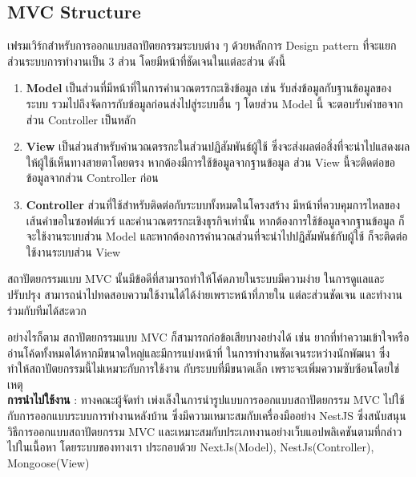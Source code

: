 \subsection{MVC Structure}
เฟรมเวิร์กสำหรับการออกแบบสถาปัตยกรรมระบบต่าง ๆ ด้วยหลักการ Design pattern
ที่จะแยกส่วนระบบการทำงานเป็น 3 ส่วน โดยมีหน้าที่ชัดเจนในแต่ละส่วน ดังนี้
\begin{enumerate}
      \item \textbf{Model} เป็นส่วนที่มีหน้าที่ในการคำนวณตรรกะเชิงข้อมูล เช่น รับส่งข้อมูลกับฐานข้อมูลของระบบ รวมไปถึงจัดการกับข้อมูลก่อนส่งไปสู่ระบบอื่น ๆ โดยส่วน Model นี้ จะตอบรับคำขอจากส่วน Controller เป็นหลัก
      \item \textbf{View} เป็นส่วนสำหรับคำนวณตรรกะในส่วนปฏิสัมพันธ์ผู้ใช้ ซึ่งจะส่งผลต่อสิ่งที่จะนำไปแสดงผลให้ผู้ใช้เห็นทางสายตาโดยตรง หากต้องมีการใช้ข้อมูลจากฐานข้อมูล ส่วน View นี้จะติดต่อขอข้อมูลจากส่วน Controller ก่อน
      \item \textbf{Controller} ส่วนที่ใช้สำหรับติดต่อกับระบบทั้งหมดในโครงสร้าง มีหน้าที่ควบคุมการไหลของเส้นคำขอในซอฟต์แวร์ และคำนวณตรรกะเชิงธุรกิจเท่านั้น หากต้องการใช้ข้อมูลจากฐานข้อมูล ก็จะใช้งานระบบส่วน Model และหากต้องการคำนวณส่วนที่จะนำไปปฏิสัมพันธ์กับผู้ใช้ ก็จะติดต่อใช้งานระบบส่วน View
\end{enumerate}
\par สถาปัตยกรรมแบบ MVC นั้นมีข้อดีที่สามารถทำให้โค้ดภายในระบบมีความง่าย
ในการดูแลและปรับปรุง สามารถนำไปทดสอบความใช้งานได้ได้ง่ายเพราะหน้าที่ภายใน
แต่ละส่วนชัดเจน และทำงานร่วมกับทีมได้สะดวก
\par อย่างไรก็ตาม สถาปัตยกรรมแบบ MVC ก็สามารถก่อข้อเสียบางอย่างได้ เช่น
ยากที่ทำความเข้าใจหรืออ่านโค้ดทั้งหมดได้หากมีขนาดใหญ่และมีการแบ่งหน้าที่
ในการทำงานชัดเจนระหว่างนักพัฒนา ซึ่งทำให้สถาปัตยกรรมนี้ไม่เหมาะกับการใช้งาน
กับระบบที่มีขนาดเล็ก เพราะจะเพิ่มความซับซ้อนโดยใช่เหตุ \\
\textbf{การนำไปใช้งาน} : ทางคณะผู้จัดทำ เพ่งเล็งในการนำรูปแบบการออกแบบสถาปัตยกรรม MVC ไปใช้กับการออกแบบระบบการทำงานหลังบ้าน ซึ่งมีความเหมาะสมกับเครื่องมืออย่าง NestJS ซึ่งสนับสนุนวิธีการออกแบบสถาปัตยกรรม MVC และเหมาะสมกับประเภทงานอย่างเว็บแอปพลิเคชันตามที่กล่าวไปในเนื้อหา โดยระบบของทางเรา ประกอบด้วย NextJs(Model), NestJs(Controller), Mongoose(View)
